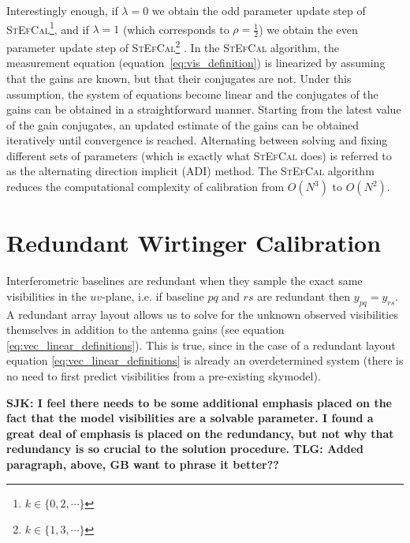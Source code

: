\documentclass[useAMS,usenatbib]{mn2e}
\begin{document}
Interestingly enough, if $\lambda = 0$ we obtain the odd parameter update step of \textsc{StEfCal}\footnote{$k\in\{0,2,\cdots\}$}, and if $\lambda=1$ (which corresponds
to $\rho=\frac{1}{2}$) we obtain the even parameter update step of \textsc{StEfCal}\footnote{$k\in\{1,3,\cdots\}$} \citep[\textsc{StEfCal},][]{Mitchell:MWA-cal,Salvini2014}. In the \textsc{StEfCal} algorithm, the measurement equation (equation~\ref{eq:vis_definition}) is linearized by assuming that the gains are known, but that their conjugates are not. Under this assumption, the system of equations become linear and the conjugates of the gains can be obtained in a straightforward manner. Starting from the latest value of the gain conjugates, an updated estimate of the gains can be obtained iteratively until convergence is reached.
Alternating between solving and fixing different sets of parameters (which is exactly what \textsc{StEfCal} does) is referred to 
as the alternating direction implicit (ADI) method. The \textsc{StEfCal} algorithm reduces the computational complexity of calibration from $O(N^3)$ to $O(N^2)$.

\section{Redundant Wirtinger Calibration}
\label{sec:red_wirtinger}
Interferometric baselines are redundant when they sample the exact same visibilities in the $uv$-plane, i.e. if baseline $pq$ and $rs$ are redundant then $y_{pq} = y_{rs}$. 
A redundant array layout allows us to solve for the unknown observed visibilities themselves in
addition to the antenna gains (see equation \ref{eq:vec_linear_definitions}). This is true, since in the case of a redundant layout equation \ref{eq:vec_linear_definitions} is already an overdetermined 
system (there is no need to first predict visibilities from a pre-existing skymodel). 

{\bf SJK: I feel there needs to be some additional emphasis placed on the fact that the model visibilities are a solvable parameter. I found a great deal of emphasis is placed on the redundancy, but not why that redundancy is so crucial to the solution procedure.}
{\bf TLG: Added paragraph, above, GB want to phrase it better??}

\end{document}
